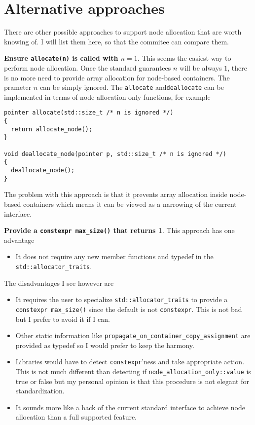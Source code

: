 \documentclass[11pt]{article}
\begin{document}
\appendix

\section{Alternative approaches} \label{alternative}

There are other possible approaches to support node allocation that are worth knowing
of.  I will list them here, so that the commitee can compare them.

\medskip
\noindent
{\bf Ensure \texttt{allocate(n)} is called with $n = 1$}. This seems the easiest
way to perform node allocation. Once the standard guarantees $n$ will be always $1$,
there is no more need to provide array allocation for node-based containers. The
prameter $n$ can be simply ignored. The \texttt{allocate} and\texttt{deallocate}
can be implemented in terms of node-allocation-only functions, for example
\medskip
\begin{lstlisting}
pointer allocate(std::size_t /* n is ignored */)
{
  return allocate_node();
}

void deallocate_node(pointer p, std::size_t /* n is ignored */)
{
  deallocate_node();
}
\end{lstlisting}

The problem with this approach is that it prevents array allocation inside
node-based containers which means it can be viewed as a narrowing of the
current interface.

\medskip
\noindent
{\bf Provide a \texttt{constexpr max\_size()} that returns 1}. This approach has one advantage

\begin{itemize}
\item It does not require any new member functions and typedef in the
\texttt{std::allocator\_traits}.
\end{itemize}

The disadvantages I see however are

\begin{itemize}
\item It requires the user to specialize \texttt{std::allocator\_traits} to
provide a \texttt{constexpr max\_size()} since the default is not
\texttt{constexpr}. This is not bad but I prefer to avoid it if I can.

\item Other static information like \texttt{propagate\_on\_container\_copy\_assignment}
are provided as typedef so I would prefer to keep the harmony.

\item Libraries would have to detect \texttt{constexpr}'ness and take appropriate action.
This is not much different than detecting if \texttt{node\_allocation\_only::value} is true or
false but my personal opinion is that this procedure is not elegant for standardization.

\item It sounds more like a hack of the current standard interface to achieve node
allocation than a full supported feature.

\end{itemize}
\end{document}
